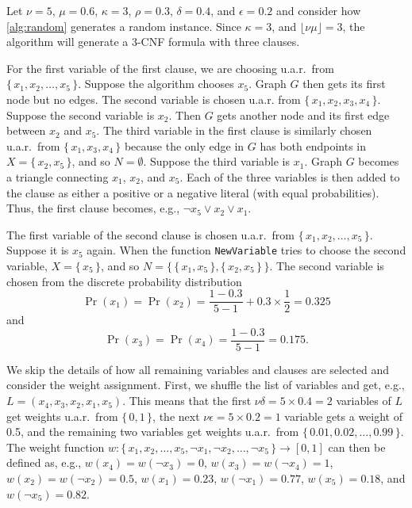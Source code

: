 \documentclass[runningheads]{llncs}
\begin{document}
\begin{example}\label{example:algorithm}
  Let $\nu = 5$, $\mu = 0.6$, $\kappa = 3$, $\rho = 0.3$, $\delta = 0.4$,
  and $\epsilon = 0.2$ and consider how \cref{alg:random} generates a random
  instance. Since $\kappa = 3$, and $\lfloor\nu\mu\rfloor = 3$,
  the algorithm will generate a 3-CNF formula with three clauses.

  For the first variable of the first clause, we are choosing u.a.r.\ from $\{\,
  x_1, x_2, \dots, x_5 \,\}$. Suppose the algorithm chooses $x_5$. Graph $G$
  then gets its first node but no edges. The second variable is chosen u.a.r.
  from $\{\, x_1, x_2, x_3, x_4 \,\}$. Suppose the second variable is $x_2$.
  Then $G$ gets another node and its first edge between $x_2$ and $x_5$. The
  third variable in the first clause is similarly chosen u.a.r.\ from $\{\, x_1,
  x_3, x_4 \,\}$ because the only edge in $G$ has both endpoints in $X = \{\,
  x_2, x_5 \,\}$, and so $N = \emptyset$. Suppose the third variable is $x_1$.
  Graph $G$ becomes a triangle connecting $x_1$, $x_2$, and $x_5$. Each of
  the three variables is then added to the clause as either a positive or a
  negative literal (with equal probabilities). Thus, the first clause becomes,
  e.g., $\neg x_5 \lor x_2 \lor x_1$.

  The first variable of the second clause is chosen u.a.r.\ from $\{\, x_1, x_2,
  \dots, x_5\,\}$. Suppose it is $x_5$ again. When the function
  \texttt{NewVariable} tries to choose the second variable, $X = \{\, x_5 \,\}$,
  and so $N = \{\, \{\, x_1, x_5 \,\}, \{\, x_2, x_5 \,\}\,\}$. The second
  variable is chosen from the discrete probability distribution
  \[
    \Pr(x_1) = \Pr(x_2) = \frac{1 - 0.3}{5 - 1} + 0.3 \times \frac{1}{2} = 0.325
  \]
  and
  \[
    \Pr(x_3) = \Pr(x_4) = \frac{1 - 0.3}{5 - 1} = 0.175.
  \]

  We skip the details of how all remaining variables and clauses are selected
  and consider the weight assignment. First, we shuffle the list of variables
  and get, e.g., $L = (x_4, x_3, x_2, x_1, x_5)$. This means that the first
  $\nu\delta = 5 \times 0.4 = 2$ variables of $L$ get weights u.a.r.\ from $\{\,
  0, 1 \,\}$, the next $\nu\epsilon = 5 \times 0.2 = 1$ variable gets a weight
  of 0.5, and the remaining two variables get weights u.a.r.\ from $\{\,0.01,
  0.02, \dots, 0.99 \,\}$. The weight function $w\colon \{\, x_1, x_2, \dots,
  x_5, \neg x_1, \neg x_2, \dots, \neg x_5\,\} \to [0, 1]$ can then be defined
  as, e.g., $w(x_4) = w(\neg x_3) = 0$, $w(x_3) = w(\neg x_4) = 1$, $w(x_2) =
  w(\neg x_2) = 0.5$, $w(x_1) = 0.23$, $w(\neg x_1) = 0.77$, $w(x_5) = 0.18$,
  and $w(\neg x_5) = 0.82$.
\end{example}
\end{document}
